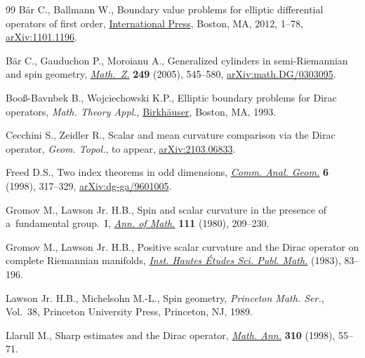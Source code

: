 \documentclass[11pt]{article}
\numberwithin{equation}{section}
\numberwithin{equation}{section}
\begin{document}
\begin{thebibliography}{99}
B\"ar C., Ballmann W., Boundary value problems for elliptic differential
 operators of first order, \href{https://doi.org/10.4310/SDG.2012.v17.n1.a1}{International Press}, Boston, MA, 2012, 1--78,
 \href{https://arxiv.org/abs/1101.1196}{arXiv:1101.1196}.

B\"ar C., Gauduchon P., Moroianu A., Generalized cylinders in semi-{R}iemannian
 and spin geometry, \href{https://doi.org/10.1007/s00209-004-0718-0}{\textit{Math.~Z.}} \textbf{249} (2005), 545--580,
 \href{https://arxiv.org/abs/math.DG/0303095}{arXiv:math.DG/0303095}.

Boo{\ss}-Bavnbek B., Wojciechowski K.P., Elliptic boundary problems for {D}irac
 operators, \textit{Math. Theory Appl.}, \href{https://doi.org/10.1007/978-1-4612-0337-7}{Birkh\"auser}, Boston, MA, 1993.

Cecchini S., Zeidler R., Scalar and mean curvature comparison via the Dirac
 operator, \textit{Geom. Topol.}, {t}o appear, \href{https://arxiv.org/abs/2103.06833}{arXiv:2103.06833}.

Freed D.S., Two index theorems in odd dimensions, \href{https://doi.org/10.4310/CAG.1998.v6.n2.a4}{\textit{Comm. Anal. Geom.}}
 \textbf{6} (1998), 317--329, \href{https://arxiv.org/abs/dg-ga/9601005}{arXiv:dg-ga/9601005}.

Gromov M., Lawson Jr. H.B., Spin and scalar curvature in the presence of a~fundamental group.~{I}, \href{https://doi.org/10.2307/1971198}{\textit{Ann. of Math.}} \textbf{111} (1980), 209--230.

Gromov M., Lawson Jr. H.B., Positive scalar curvature and the {D}irac operator
 on complete {R}iemannian manifolds, \href{https://doi.org/10.1007/BF02953774}{\textit{Inst. Hautes \'Etudes Sci. Publ.
 Math.}} (1983), 83--196.

Lawson Jr. H.B., Michelsohn M.-L., Spin geometry, \textit{Princeton Math. Ser.},
 Vol.~38, Princeton University Press, Princeton, NJ, 1989.

Llarull M., Sharp estimates and the {D}irac operator, \href{https://doi.org/10.1007/s002080050136}{\textit{Math. Ann.}}
 \textbf{310} (1998), 55--71.

\end{thebibliography}
\end{document}
